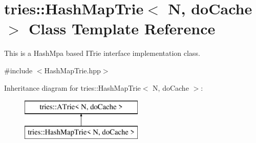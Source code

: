 \hypertarget{classtries_1_1_hash_map_trie}{}\section{tries\+:\+:Hash\+Map\+Trie$<$ N, do\+Cache $>$ Class Template Reference}
\label{classtries_1_1_hash_map_trie}


This is a Hash\+Mpa based I\+Trie interface implementation class.  




{\ttfamily \#include $<$Hash\+Map\+Trie.\+hpp$>$}

Inheritance diagram for tries\+:\+:Hash\+Map\+Trie$<$ N, do\+Cache $>$\+:\begin{figure}[H]
\begin{center}
\leavevmode
\includegraphics[height=2.000000cm]{classtries_1_1_hash_map_trie}
\end{center}
\end{figure}
